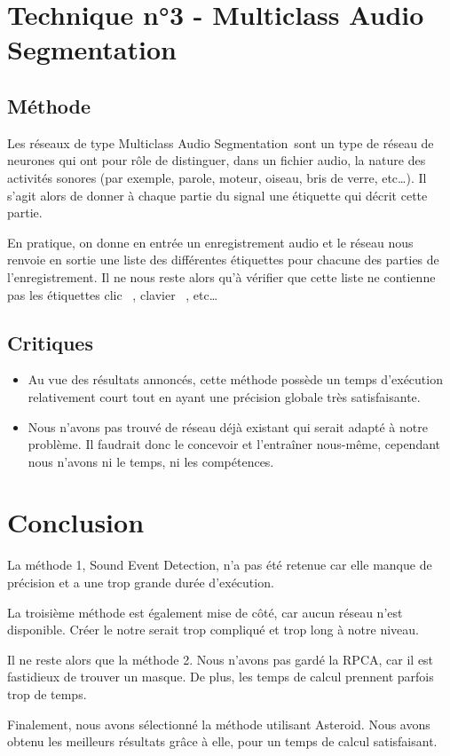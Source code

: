 \documentclass{article}
\begin{document}
\section{Technique n°3 - Multiclass Audio Segmentation}

\subsection{Méthode}

Les réseaux de type \og Multiclass Audio Segmentation\fg\ sont un type de réseau de neurones qui ont pour rôle de distinguer, dans un fichier audio, la nature des activités sonores (par exemple, parole, moteur, oiseau, bris de verre, etc\ldots). Il s'agit alors de donner à chaque partie du signal une étiquette qui décrit cette partie.

En pratique, on donne en entrée un enregistrement audio et le réseau nous renvoie en sortie une liste des différentes étiquettes pour chacune des parties de l'enregistrement. Il ne nous reste alors qu'à vérifier que cette liste ne contienne pas les étiquettes \og clic \fg\ , \og clavier \fg\ , etc\ldots

\subsection{Critiques}

\begin{itemize}
    \item Au vue des résultats annoncés, cette méthode possède un temps d’exécution relativement court tout en ayant une précision globale très satisfaisante.
    \item Nous n’avons pas trouvé de réseau déjà existant qui serait adapté à notre problème. Il faudrait donc le concevoir et l’entraîner nous-même, cependant nous n’avons ni le temps, ni les compétences. 
\end{itemize}


\section{Conclusion}

La méthode 1, Sound Event Detection, n'a pas été retenue car elle manque de précision et a une trop grande durée d'exécution. 

La troisième méthode est également mise de côté, car aucun réseau n'est disponible. Créer le notre serait trop compliqué et trop long à notre niveau.

Il ne reste alors que la méthode 2. Nous n'avons pas gardé la RPCA, car il est fastidieux de trouver un masque. De plus, les temps de calcul prennent parfois trop de temps.

Finalement, nous avons sélectionné la méthode utilisant Asteroid. Nous avons obtenu les meilleurs résultats grâce à elle, pour un temps de calcul satisfaisant.
\end{document}
